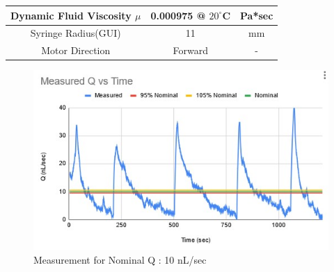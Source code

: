 \documentclass[journal]{IEEEtran}
\begin{document}
\begin{table}[H]
\begin{center}
\begin{tabular}{|c|c|c|}
                                Dynamic Fluid Viscosity \(\mu\) &
                                0.000975 @ \(20^\circ\)C&
                                Pa*sec
                                \\ \hline
                                
                                
                                Syringe Radius(GUI)&
                                11&
                                mm
                                \\ \hline
                                
                                Motor Direction&
                                Forward&
                                -
                                \\ \hline
                                
                            \end{tabular}
                        \end{center}
                    \end{table}
                    
                \begin{figure}[H]
                    \centering
                    \includegraphics[scale = 0.60]{T4}
                    \caption{Measurement for Nominal Q : 10 nL/sec}
                    \label{fig:T4}
                \end{figure}
                
\end{document}
